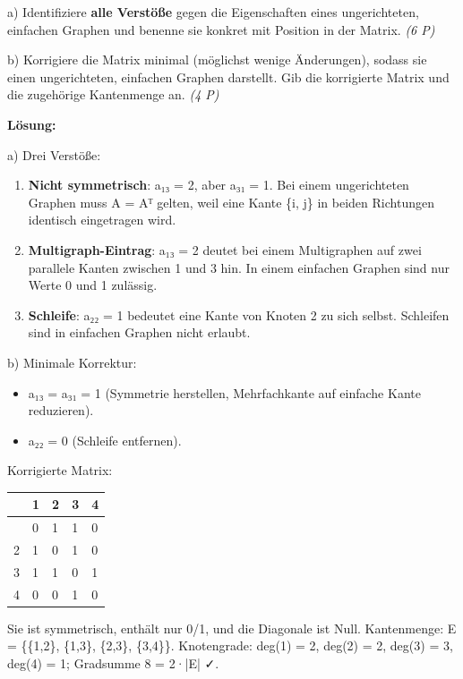 \documentclass[11pt, a4paper]{article}
\begin{document}
a) Identifiziere \textbf{alle Verstöße} gegen die Eigenschaften eines ungerichteten, einfachen Graphen und benenne sie konkret mit Position in der Matrix. \textit{(6 P)}


b) Korrigiere die Matrix minimal (möglichst wenige Änderungen), sodass sie einen ungerichteten, einfachen Graphen darstellt. Gib die korrigierte Matrix und die zugehörige Kantenmenge an. \textit{(4 P)}


\textbf{Lösung:}


a) Drei Verstöße:


\begin{enumerate}
  \item \textbf{Nicht symmetrisch}: a₁₃ = 2, aber a₃₁ = 1. Bei einem ungerichteten Graphen muss A = Aᵀ gelten, weil eine Kante \{i, j\} in beiden Richtungen identisch eingetragen wird.
  \item \textbf{Multigraph-Eintrag}: a₁₃ = 2 deutet bei einem Multigraphen auf zwei parallele Kanten zwischen 1 und 3 hin. In einem einfachen Graphen sind nur Werte 0 und 1 zulässig.
  \item \textbf{Schleife}: a₂₂ = 1 bedeutet eine Kante von Knoten 2 zu sich selbst. Schleifen sind in einfachen Graphen nicht erlaubt.
\end{enumerate}

b) Minimale Korrektur:

\begin{itemize}
  \item a₁₃ = a₃₁ = 1 (Symmetrie herstellen, Mehrfachkante auf einfache Kante reduzieren).
  \item a₂₂ = 0 (Schleife entfernen).
\end{itemize}

Korrigierte Matrix:



{\small
\begin{tabularx}{\linewidth}{XXXXX}
\hline
\rowcolor{tableheadbg}
{\color{white}\textbf{}} & {\color{white}\textbf{1}} & {\color{white}\textbf{2}} & {\color{white}\textbf{3}} & {\color{white}\textbf{4}} \\[2pt]
\hline
\endhead
\hline
\endfoot
1 & 0 & 1 & 1 & 0 \\
2 & 1 & 0 & 1 & 0 \\
3 & 1 & 1 & 0 & 1 \\
4 & 0 & 0 & 1 & 0 \\
\end{tabularx}
}


Sie ist symmetrisch, enthält nur 0/1, und die Diagonale ist Null. Kantenmenge: E = \{\{1,2\}, \{1,3\}, \{2,3\}, \{3,4\}\}. Knotengrade: deg(1) = 2, deg(2) = 2, deg(3) = 3, deg(4) = 1; Gradsumme 8 = 2·|E| ✓.
\end{document}
